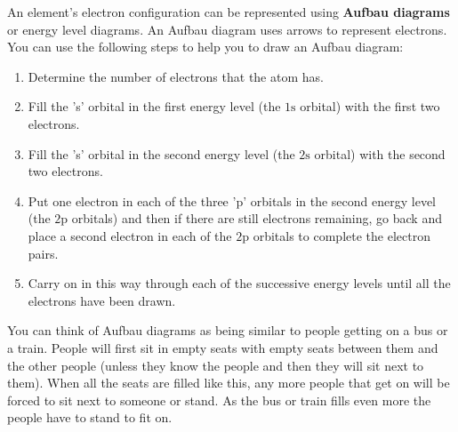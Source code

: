 \label{m38741*id259628}An element's electron configuration can be represented using \textbf{Aufbau diagrams} or energy level diagrams. An Aufbau diagram uses arrows to represent electrons. You can use the following steps to help you to draw an Aufbau diagram:\par 
        \label{m38741*id259639}\begin{enumerate}[noitemsep, label=\textbf{\arabic*}. ] 
            \label{m38741*uid96}\item Determine the number of electrons that the atom has.
\label{m38741*uid97}\item Fill the 's' orbital in the first energy level (the $1\mathrm{s}$ orbital) with the first two electrons.
\label{m38741*uid98}\item Fill the 's' orbital in the second energy level (the $2\mathrm{s}$ orbital) with the second two electrons.
\label{m38741*uid99}\item Put one electron in each of the three 'p' orbitals in the second energy level (the $2\mathrm{p}$ orbitals) and then if there are still electrons remaining, go back and place a second electron in each of the $2\mathrm{p}$ orbitals to complete the electron pairs.
\label{m38741*uid100}\item Carry on in this way through each of the successive energy levels until all the electrons have been drawn.
\end{enumerate}

        

      
\label{m38741*eip-873}You can think of Aufbau diagrams as being similar to people getting on a bus or a train. People will first sit in empty seats with empty seats between them and the other people (unless they know the people and then they will sit next to them). When all the seats are filled like this, any more people that get on will be forced to sit next to someone or stand. As the bus or train fills even more the people have to stand to fit on. \par \label{m38741*id259728}

